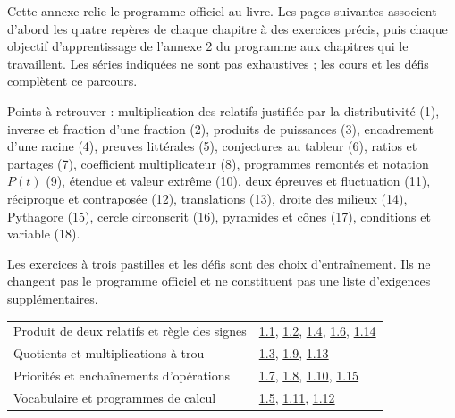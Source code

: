 \clearpage{}\label{couverture-programme}\gdef\otChapNum{0}\pagestyle{otFront}
Cette annexe relie le programme officiel au livre. Les pages suivantes
associent d’abord les quatre repères de chaque chapitre à des exercices
précis, puis chaque objectif d’apprentissage de l’annexe 2 du programme
aux chapitres qui le travaillent. Les séries indiquées ne sont pas
exhaustives ; les cours et les défis complètent ce parcours.\par\bigskip
Points à retrouver : multiplication des relatifs justifiée par la distributivité (1),
inverse et fraction d’une fraction (2), produits de puissances (3), encadrement
d’une racine (4), preuves littérales (5), conjectures au tableur (6), ratios et
partages (7), coefficient multiplicateur (8), programmes remontés et notation
$P(t)$ (9), étendue et valeur extrême (10), deux épreuves et fluctuation (11),
réciproque et contraposée (12), translations (13), droite des milieux (14),
Pythagore (15), cercle circonscrit (16), pyramides et cônes (17), conditions
et variable (18).\par\bigskip
\begin{attention}Les exercices à trois pastilles et les défis sont des choix d’entraînement. Ils ne changent pas le programme officiel et ne constituent pas une liste d’exigences supplémentaires.\end{attention}
\clearpage
{}\fontsize{10}{13}\selectfont
{}\begin{tabularx}{\linewidth}{@{}Yl@{}}\toprule
Produit de deux relatifs et règle des signes & \hyperref[exo-1-1]{1.1}, \hyperref[exo-1-2]{1.2}, \hyperref[exo-1-4]{1.4}, \hyperref[exo-1-6]{1.6}, \hyperref[exo-1-14]{1.14}\\[2mm]
Quotients et multiplications à trou & \hyperref[exo-1-3]{1.3}, \hyperref[exo-1-9]{1.9}, \hyperref[exo-1-13]{1.13}\\[2mm]
Priorités et enchaînements d’opérations & \hyperref[exo-1-7]{1.7}, \hyperref[exo-1-8]{1.8}, \hyperref[exo-1-10]{1.10}, \hyperref[exo-1-15]{1.15}\\[2mm]
Vocabulaire et programmes de calcul & \hyperref[exo-1-5]{1.5}, \hyperref[exo-1-11]{1.11}, \hyperref[exo-1-12]{1.12}\\[2mm]
\bottomrule\end{tabularx}\par\vspace{4mm}
